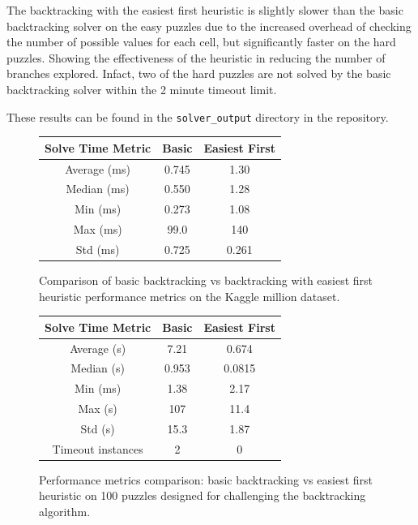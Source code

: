 \documentclass[11pt]{article}
\begin{document}
The backtracking with the easiest first heuristic is slightly slower than the basic backtracking solver on the easy puzzles due to the increased overhead of checking the number of possible values for each cell, but significantly faster on the hard puzzles. Showing the effectiveness of the heuristic in reducing the number of branches explored. Infact, two of the hard puzzles are not solved by the basic backtracking solver within the 2 minute timeout limit.

These results can be found in the \texttt{solver\_output} directory in the repository. 
\begin{figure}[H]
    \centering
    \begin{tabular}{|c|c|c|}
    \hline
    Solve Time Metric & Basic & Easiest First \\
    \hline
    Average (ms) & 0.745 & 1.30 \\
    \hline
    Median (ms) & 0.550 & 1.28 \\
    \hline
    Min (ms) & 0.273 & 1.08 \\
    \hline
    Max (ms) & 99.0 & 140 \\
    \hline
    Std (ms) & 0.725 & 0.261 \\
    \hline
    \end{tabular}
    \caption{Comparison of basic backtracking vs backtracking with easiest first heuristic performance metrics on the Kaggle million dataset.}
    \label{fig:kaggle-million}
\end{figure}

\begin{figure}[H]
    \centering
    \begin{tabular}{|c|c|c|}
    \hline
    Solve Time Metric & Basic & Easiest First \\
    \hline
    Average (s) & 7.21 & 0.674 \\
    \hline
    Median (s) & 0.953 & 0.0815 \\
    \hline
    Min (ms) & 1.38 & 2.17 \\
    \hline
    Max (s) & 107 & 11.4 \\
    \hline
    Std (s) & 15.3 & 1.87 \\
    \hline
    Timeout instances & 2 & 0 \\
    \hline
    \end{tabular}
    \caption{Performance metrics comparison: basic backtracking vs easiest first heuristic on 100 puzzles designed for challenging the backtracking algorithm.}
    \label{fig:hard-100}
\end{figure}
\end{document}
